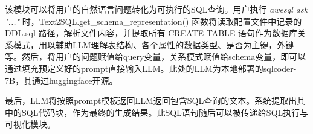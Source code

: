 \begin{CJK*}{UTF8}{song}

该模块可以将用户的自然语言问题转化为可执行的SQL查询。用户执行 \textit{awesql ask "..."} 时，Text2SQL.get\_schema\_representation() 函数将读取配置文件中记录的 DDL.sql 路径，解析文件内容，并提取所有 CREATE TABLE 语句作为数据库关系模式，用以辅助LLM理解表结构、各个属性的数据类型、是否为主键，外键等。然后，将用户的问题赋值给query变量，关系模式赋值给schema变量，即可以通过填充预定义好的prompt直接输入LLM。此处的LLM为本地部署的sqlcoder-7B，其通过huggingface开源。

最后，LLM将按照prompt模板返回LLM返回包含SQL查询的文本。系统提取出其中的SQL代码块，作为最终的生成结果。此SQL语句随后可以被传递给SQL执行与可视化模块。

\end{CJK*}